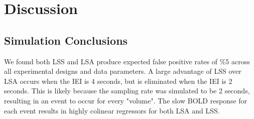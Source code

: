\documentclass[10pt,letterpaper]{article}
\begin{document}





\section*{Discussion}

\subsection*{Simulation Conclusions}
We found both LSS and LSA produce expected false positive rates of \%5
across all experimental designs and data parameters.
A large advantage of LSS over LSA occurs when the IEI is 4 seconds, but is eliminated
when the IEI is 2 seconds.
This is likely because the sampling rate was simulated to be 2 seconds, resulting
in an event to occur for every "volume".
The slow BOLD response for each event results in highly colinear regressors for both LSA and LSS.
\end{document}
